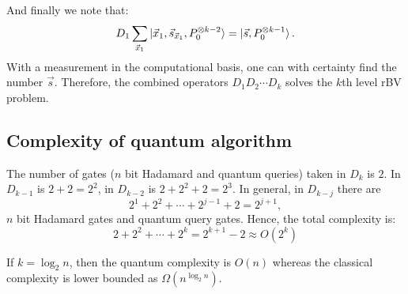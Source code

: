 \documentclass{article}
\begin{document}
And finally we note that:
\begin{equation}
  D_1 \sum_{\vec{x}_1}\ket{\vec{x}_1, \vec{s}_{\vec{x}_1}, P_0^{\otimes k-2}} =
  \ket{\vec{s}, P_0^{\otimes k-1}}.
\end{equation}
With a measurement in the computational basis, one can with certainty find the
number $\vec{s}$. Therefore, the combined operators $D_1D_2\cdots D_k$ solves
the $k$th level rBV problem.

\subsection{Complexity of quantum algorithm}
\label{sec:Complexity of quantum algorithm}
The number of gates ($n$ bit Hadamard and quantum queries) taken in $D_k$ is
$2$. In $D_{k-1}$ is $2+2=2^2$, in $D_{k-2}$ is $2+2^2+2=2^3$. In general, in
$D_{k-j}$ there are
\begin{equation}
  2^1 + 2^2 + \cdots + 2^{j-1} + 2 = 2^{j+1},
\end{equation}
$n$ bit Hadamard gates and quantum query gates. Hence, the total complexity is:
\begin{equation}
  2 + 2^2 + \cdots + 2^k = 2^{k+1}-2 \approx O(2^k)
\end{equation}

If $k=\log_2 n$, then the quantum complexity is $O(n)$ whereas the classical
complexity is lower bounded as $\Omega(n^{\log_2 n})$.
\end{document}
